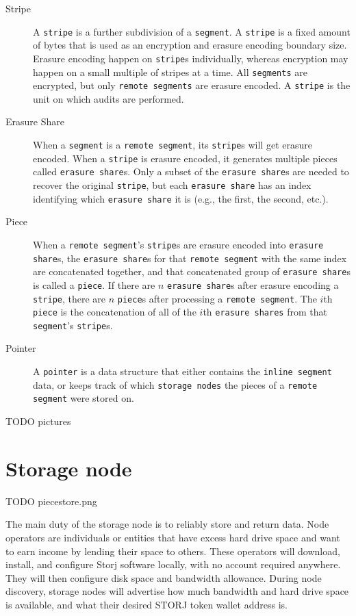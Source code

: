 \documentclass[11pt,fleqn,openany]{book}
\newcommand{\x}[1]{{\tt #1}} \newcommand{\code}[1]{{\em #1}}
\newcommand{\todo}[1]{{\color{red} TODO #1 }}
\begin{document}
\begin{description}
\item[Stripe] A \x{stripe} is a further subdivision of a \x{segment}. A
\x{stripe} is a fixed amount of bytes that is used as an encryption and erasure
encoding boundary size. Erasure encoding happen on \x{stripe}s individually,
whereas encryption may happen on a small multiple of stripes at a time. All
\x{segments} are encrypted, but only \x{remote segments} are erasure encoded.
A \x{stripe} is the unit on which audits are performed.

\item[Erasure Share] When a \x{segment} is a \x{remote segment}, its \x{stripe}s
will get erasure encoded. When a \x{stripe} is erasure encoded, it generates
multiple pieces called \x{erasure share}s. Only a subset of the \x{erasure
share}s are needed to recover the original \x{stripe}, but each \x{erasure
share} has an index identifying which \x{erasure share} it is (e.g., the first,
the second, etc.).

\item[Piece] When a \x{remote segment}'s \x{stripe}s are erasure encoded into
\x{erasure share}s, the \x{erasure share}s for that \x{remote segment} with the
same index are concatenated together, and that concatenated group of \x{erasure
share}s is called a \x{piece}. If there are $n$ \x{erasure share}s after erasure
encoding a \x{stripe}, there are $n$ \x{piece}s after processing a \x{remote
segment}. The $i$th \x{piece} is the concatenation of all of the $i$th
\x{erasure shares} from that \x{segment}'s \x{stripe}s.

\item[Pointer] A \x{pointer} is a data structure that either contains the
\x{inline segment} data, or keeps track of which
\x{storage nodes} the pieces of a \x{remote segment} were stored on.
\end{description}

\todo{pictures}

\section{Storage node}

\todo{piecestore.png}

The main duty of the storage node is to reliably store and return data.
Node operators
are individuals or entities that have excess hard drive space and want to earn
income by lending their space to others. These operators will
download,
install, and configure Storj software locally, with no account required
anywhere. They will then configure disk space and bandwidth allowance.
During node discovery, storage nodes will advertise how much bandwidth and
hard drive space is available, and what their desired STORJ token
wallet address is.
\end{document}
